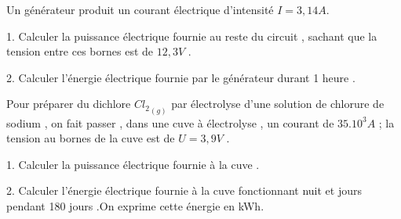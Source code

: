 \documentclass[12pt]{article}
\begin{document}
\begin{tcolorbox}[colback=blue!15!white,
                  colframe=blue!50!black,
                  title=Application 3 :
                 ]
Un générateur produit un courant électrique d’intensité $I = 3,14A$.

  1. Calculer la puissance électrique fournie au reste du circuit ,
sachant que la tension entre ces bornes est de $12,3V$ .

  2. Calculer l’énergie électrique fournie par le générateur durant
1 heure .

\end{tcolorbox}


\begin{tcolorbox}[colback=blue!15!white,
                  colframe=blue!50!black,
                  title=Application 4 :
                 ]
                 Pour préparer du dichlore ${Cl_2}_{(g)}$ par électrolyse d’une solution de
chlorure de sodium , on fait passer , dans une cuve à électrolyse ,
un courant de $35.10^3A$ ; la tension au bornes de la cuve est de
$U = 3,9V$ .

  1. Calculer la puissance électrique fournie à la cuve .

  2. Calculer l’énergie électrique fournie à la cuve fonctionnant
nuit et jours pendant 180 jours .On exprime cette énergie en kWh.

\end{tcolorbox}
\end{document}
